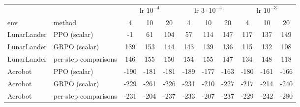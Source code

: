 \begin{tabular}{llccccccccc}
\toprule
 & & \multicolumn{3}{c}{lr $10^{-4}$} & \multicolumn{3}{c}{lr $3\cdot10^{-4}$} & \multicolumn{3}{c}{lr $10^{-3}$} \\
\cmidrule(lr){3-5}\cmidrule(lr){6-8}\cmidrule(lr){9-11}
env & method & 4 & 10 & 20 & 4 & 10 & 20 & 4 & 10 & 20 \\
\midrule
LunarLander & PPO (scalar) & -1 & 61 & 104 & 57 & 114 & 147 & 117 & 137 & 149 \\
LunarLander & GRPO (scalar) & 139 & 153 & 144 & 143 & 139 & 136 & 115 & 132 & 108 \\
LunarLander & per-step comparisons & 146 & 155 & 150 & 154 & 155 & 147 & 134 & 148 & 118 \\
Acrobot & PPO (scalar) & -190 & -181 & -181 & -189 & -177 & -163 & -180 & -161 & -166 \\
Acrobot & GRPO (scalar) & -229 & -261 & -226 & -231 & -210 & -227 & -217 & -214 & -240 \\
Acrobot & per-step comparisons & -231 & -204 & -237 & -233 & -207 & -237 & -229 & -242 & -280 \\
\bottomrule
\end{tabular}
